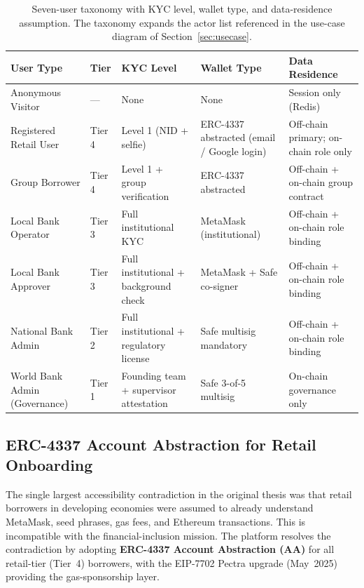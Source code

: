 \documentclass[12pt,a4paper]{report}
\begin{document}
\begin{table}[H]
\centering
\caption{Seven-user taxonomy with KYC level, wallet type, and data-residence assumption. The taxonomy expands the actor list referenced in the use-case diagram of Section~\ref{sec:usecase}.}
\label{tab:user-taxonomy}
\small
\begin{tabular}{p{3.1cm}p{1.4cm}p{2.6cm}p{2.4cm}p{3.4cm}}
\hline
\textbf{User Type} & \textbf{Tier} & \textbf{KYC Level} & \textbf{Wallet Type} & \textbf{Data Residence} \\
\hline
Anonymous Visitor & --- & None & None & Session only (Redis) \\
\hline
Registered Retail User & Tier 4 & Level 1 (NID + selfie) & ERC-4337 abstracted (email / Google login) & Off-chain primary; on-chain role only \\
\hline
Group Borrower & Tier 4 & Level 1 + group verification & ERC-4337 abstracted & Off-chain + on-chain group contract \\
\hline
Local Bank Operator & Tier 3 & Full institutional KYC & MetaMask (institutional) & Off-chain + on-chain role binding \\
\hline
Local Bank Approver & Tier 3 & Full institutional + background check & MetaMask + Safe co-signer & Off-chain + on-chain role binding \\
\hline
National Bank Admin & Tier 2 & Full institutional + regulatory license & Safe multisig mandatory & Off-chain + on-chain role binding \\
\hline
World Bank Admin (Governance) & Tier 1 & Founding team + supervisor attestation & Safe 3-of-5 multisig & On-chain governance only \\
\hline
\end{tabular}
\end{table}

\subsection{ERC-4337 Account Abstraction for Retail Onboarding}
\label{sec:erc4337}

The single largest accessibility contradiction in the original thesis was that retail borrowers in developing economies were assumed to already understand MetaMask, seed phrases, gas fees, and Ethereum transactions. This is incompatible with the financial-inclusion mission. The platform resolves the contradiction by adopting \textbf{ERC-4337 Account Abstraction (AA)} for all retail-tier (Tier~4) borrowers, with the EIP-7702 Pectra upgrade (May~2025) providing the gas-sponsorship layer.
\end{document}
